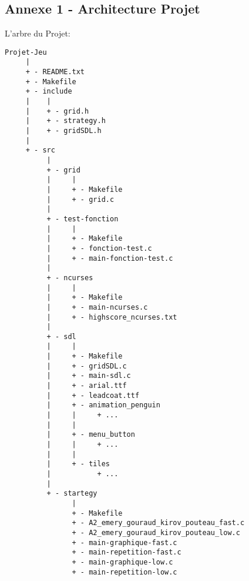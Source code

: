 \documentclass[a4paper]{article}
\begin{document}
\subsection{Annexe 1 - Architecture Projet}
\label{sec-7-1}
\noindent
L'arbre du Projet:
{\footnotesize
\begin{verbatim}
Projet-Jeu 
     |                                                                                      
     + - README.txt                                             
     + - Makefile                                           
     + - include                                      
     |    |                                      
     |    + - grid.h                                      
     |    + - strategy.h                                      
     |    + - gridSDL.h                                      
     |
     + - src
          |                                           
          + - grid                                           
          |     |                                      
          |     + - Makefile                                      
          |     + - grid.c                                      
          |
          + - test-fonction                                      
          |     |                                      
          |     + - Makefile                                      
          |     + - fonction-test.c                                      
          |     + - main-fonction-test.c                                      
          |                                          
          + - ncurses
          |     |
          |     + - Makefile                                      
          |     + - main-ncurses.c                                      
          |     + - highscore_ncurses.txt                                      
          |                                           
          + - sdl
          |     |                                      
          |     + - Makefile                                      
          |     + - gridSDL.c                                      
          |     + - main-sdl.c
          |     + - arial.ttf                                      
          |     + - leadcoat.ttf                                      
          |     + - animation_penguin                                     
          |     |     + ...                               
          |     |                                      
          |     + - menu_button                                     
          |     |     + ...                               
          |     |                                      
          |     + - tiles
          |           + ...                               
          |                                           
          + - startegy
                |                                      
                + - Makefile                                      
                + - A2_emery_gouraud_kirov_pouteau_fast.c
                + - A2_emery_gouraud_kirov_pouteau_low.c
                + - main-graphique-fast.c
                + - main-repetition-fast.c
                + - main-graphique-low.c
                + - main-repetition-low.c
\end{verbatim}
}
\newpage
\end{document}
